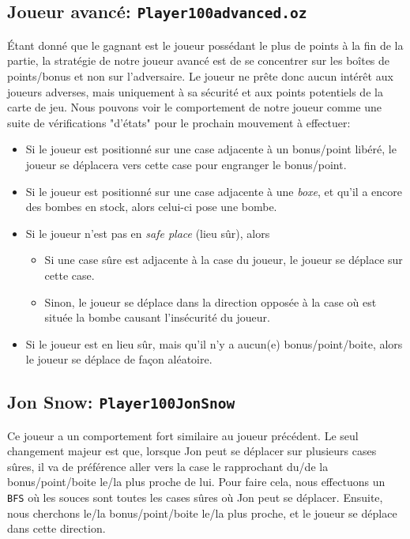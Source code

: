 \documentclass{article}
\begin{document}
\subsection{Joueur avancé: \texttt{Player100advanced.oz}}
Étant donné que le gagnant est le joueur possédant le plus de points à la fin de la partie, la stratégie de notre joueur avancé est de se concentrer sur les boîtes de points/bonus et non sur l'adversaire. Le joueur ne prête donc aucun intérêt aux joueurs adverses, mais uniquement à sa sécurité et aux points potentiels de la carte de jeu. Nous pouvons voir le comportement de notre joueur comme une suite de vérifications "d'états" pour le prochain mouvement à effectuer:
\begin{itemize}
	\item Si le joueur est positionné sur une case adjacente à un bonus/point libéré, le joueur se déplacera vers cette case pour engranger le bonus/point.
	\item Si le joueur est positionné sur une case adjacente à une \emph{boxe}, et qu'il a encore des bombes en stock, alors celui-ci pose une bombe.
	\item Si le joueur n'est pas en \emph{safe place} (lieu sûr), alors
		\begin{itemize}
			\item Si une case sûre est adjacente à la case du joueur, le joueur se déplace sur cette case.
			\item Sinon, le joueur se déplace dans la direction opposée à la case où est située la bombe causant l'insécurité du joueur.
		\end{itemize}
	\item Si le joueur est en lieu sûr, mais qu'il n'y a aucun(e) bonus/point/boite, alors le joueur se déplace de façon aléatoire.
\end{itemize}
\subsection{Jon Snow: \texttt{Player100JonSnow}}
Ce joueur a un comportement fort similaire au joueur précédent. Le seul changement majeur est que, lorsque Jon peut se déplacer sur plusieurs cases sûres, il va de préférence aller vers la case le rapprochant du/de la bonus/point/boite le/la plus proche de lui. Pour faire cela, nous effectuons un \texttt{BFS} où les souces sont toutes les cases sûres où Jon peut se déplacer. Ensuite, nous cherchons le/la bonus/point/boite le/la plus proche, et le joueur se déplace dans cette direction.
\end{document}
